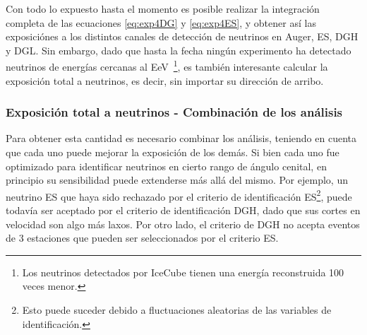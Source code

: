 	Con todo lo expuesto hasta el momento es posible realizar la integración completa de las ecuaciones \ref{eq:exp4DG} y \ref{eq:exp4ES}, y obtener así las exposiciónes a los distintos canales de detección de neutrinos en Auger, ES, DGH y DGL.
	Sin embargo, dado que hasta la fecha ningún experimento ha detectado neutrinos de energías cercanas al EeV~\footnote{Los neutrinos detectados por IceCube tienen una energía reconstruida 100 veces menor.}, es también interesante calcular la exposición total a neutrinos, es decir, sin importar su dirección de arribo.
	
	\subsubsection{Exposición total a neutrinos - Combinaci\'on de los análisis}
	
	Para obtener esta cantidad es necesario combinar los análisis, teniendo en cuenta que cada uno puede mejorar la exposición de los demás.
	Si bien cada uno fue optimizado para identificar neutrinos en cierto rango de ángulo cenital, en principio su sensibilidad puede extenderse más allá del mismo.
	Por ejemplo, un neutrino ES que haya sido rechazado por el criterio de identificación ES\footnote{Esto puede suceder debido a fluctuaciones aleatorias de las variables de identificaci\'on.}, puede todav\'ia ser aceptado por el criterio de identificación DGH, dado que sus cortes en velocidad son algo más laxos.
	Por otro lado, el criterio de DGH no acepta eventos de 3 estaciones que pueden ser seleccionados por el criterio ES.
	
